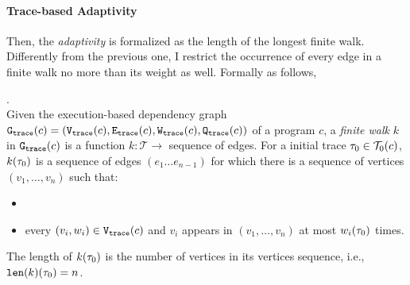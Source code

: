 \paragraph{Trace-based Adaptivity}
Then, the \emph{adaptivity} is formalized as the 
length of the longest finite walk. 
Differently from the previous one, I restrict 
the occurrence of every edge in a finite walk no more than its weight as well. Formally as follows,
\begin{defn}.
  \label{def:finitewalk}
  \\
  Given the execution-based dependency graph $\mathtt{{G_{trace}}}({c}) = (\mathtt{{V_{trace}}}({c}), \mathtt{{E_{trace}}}({c}), \mathtt{{W_{trace}}}({c}), \mathtt{{Q_{trace}}}({c}))$ of a program $c$,
  a \emph{finite walk} $k$ in $\mathtt{{G_{trace}}}({c})$ is a 
  function $k: \mathcal{T} \to $ sequence of edges.
  For a initial trace $\mathtt{\tau}_0 \in \mathcal{T}_0(c)$, 
  $k(\mathtt{\tau}_0)$ is a sequence of edges $(e_1 \ldots e_{n - 1})$ 
  for which there is a sequence of vertices 
  $(v_1, \ldots, v_{n})$ such that:
  \begin{itemize}
      \item {}
      \item every $(v_i, w_i) \in \mathtt{{V_{trace}}}(c)$
       and $v_i$ appears in $(v_1, \ldots, v_{n})$ at most 
    $w_i(\mathtt{\tau}_0)$
      times.  
  \end{itemize}
  The length of $k(\mathtt{\tau}_0)$ is the number of vertices in its vertices sequence, i.e., $\mathtt{len}(k)(\mathtt{\tau}_0) = n$.
 \end{defn}

